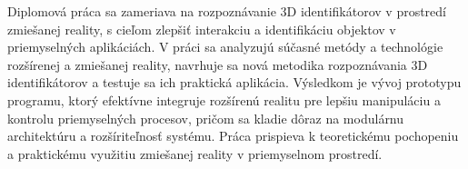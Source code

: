 Diplomová práca sa zameriava na rozpoznávanie 3D identifikátorov v prostredí zmiešanej reality, s cieľom zlepšiť interakciu a identifikáciu objektov v priemyselných aplikáciách. V práci sa analyzujú súčasné metódy a technológie rozšírenej a zmiešanej reality, navrhuje sa nová metodika rozpoznávania 3D identifikátorov a testuje sa ich praktická aplikácia. Výsledkom je vývoj prototypu programu, ktorý efektívne integruje rozšírenú realitu pre lepšiu manipuláciu a kontrolu priemyselných procesov, pričom sa kladie dôraz na modulárnu architektúru a rozšíriteľnosť systému. Práca prispieva k teoretickému pochopeniu a praktickému využitiu zmiešanej reality v priemyselnom prostredí.